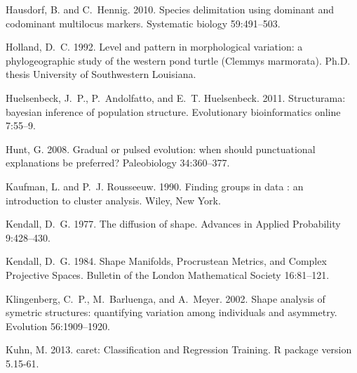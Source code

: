 \documentclass[12pt,letterpaper]{article}
\begin{document}
\begin{thebibliography}{77}
        Hausdorf, B. and C.~Hennig. 2010. {Species delimitation using dominant and
        codominant multilocus markers.} Systematic biology 59:491--503.

        Holland, D.~C. 1992. {Level and pattern in morphological variation: a
        phylogeographic study of the western pond turtle (Clemmys marmorata)}. Ph.D.
        thesis University of Southwestern Louisiana.

        Huelsenbeck, J.~P., P.~Andolfatto, and E.~T. Huelsenbeck. 2011. {Structurama:
        bayesian inference of population structure.} Evolutionary bioinformatics
        online 7:55--9.

        Hunt, G. 2008. {Gradual or pulsed evolution: when should punctuational
        explanations be preferred?} Paleobiology 34:360--377.

        Kaufman, L. and P.~J. Rousseeuw. 1990. {Finding groups in data : an
        introduction to cluster analysis}. Wiley, New York.

        Kendall, D.~G. 1977. {The diffusion of shape}. Advances in Applied Probability
        9:428--430.

        Kendall, D.~G. 1984. {Shape Manifolds, Procrustean Metrics, and Complex
        Projective Spaces}. Bulletin of the London Mathematical Society 16:81--121.

        Klingenberg, C.~P., M.~Barluenga, and A.~Meyer. 2002. {Shape analysis of
        symetric structures: quantifying variation among individuals and asymmetry}.
        Evolution 56:1909--1920.

        Kuhn, M. 2013. caret: Classification and Regression Training. R package version
        5.15-61.


\end{thebibliography}
\end{document}
